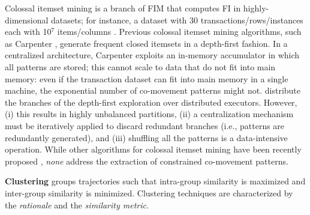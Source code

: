 \documentclass[preprint,12pt,authoryear]{elsarticle} %
\newcommand{\mg}[1]{{\color{red}{\textbf{#1}}}}
\begin{document}
Colossal itemset mining is a branch of FIM that computes FI in highly-dimensional datasets; for instance, a dataset with 30 transactions/rows/instances each with 10$^7$ items/columns \citep{DBLP:journals/bdr/ApilettiBCGPM17}.
Previous colossal itemset mining algorithms, such as Carpenter \citep{DBLP:conf/kdd/PanCTYZ03}, generate frequent closed itemsets in a depth-first fashion.
In a centralized architecture, Carpenter exploits an in-memory accumulator in which all patterns are stored; this cannot scale to data that do not fit into main memory: even if the transaction dataset can fit into main memory in a single machine, the exponential number of co-movement patterns might not.
\cite{DBLP:journals/bdr/ApilettiBCGPM17} distribute the branches of the depth-first exploration over distributed executors. 
However, (i) this results in highly unbalanced partitions,
(ii) a centralization mechanism must be iteratively applied to discard redundant branches (i.e., patterns are redundantly generated),
and (iii) shuffling all the patterns is a data-intensive operation.
While other algorithms for colossal itemset mining have been recently proposed \citep{DBLP:conf/kdd/PanCTYZ03,DBLP:journals/kbs/ZakiZ18,DBLP:journals/isci/VanahalliP19}, \textit{none} address the extraction of constrained co-movement patterns.

\textbf{Clustering}
groups trajectories such that intra-group similarity is maximized and inter-group similarity is minimized. 
Clustering techniques are characterized by the \textit{rationale} and the \textit{similarity metric}.
\end{document}

